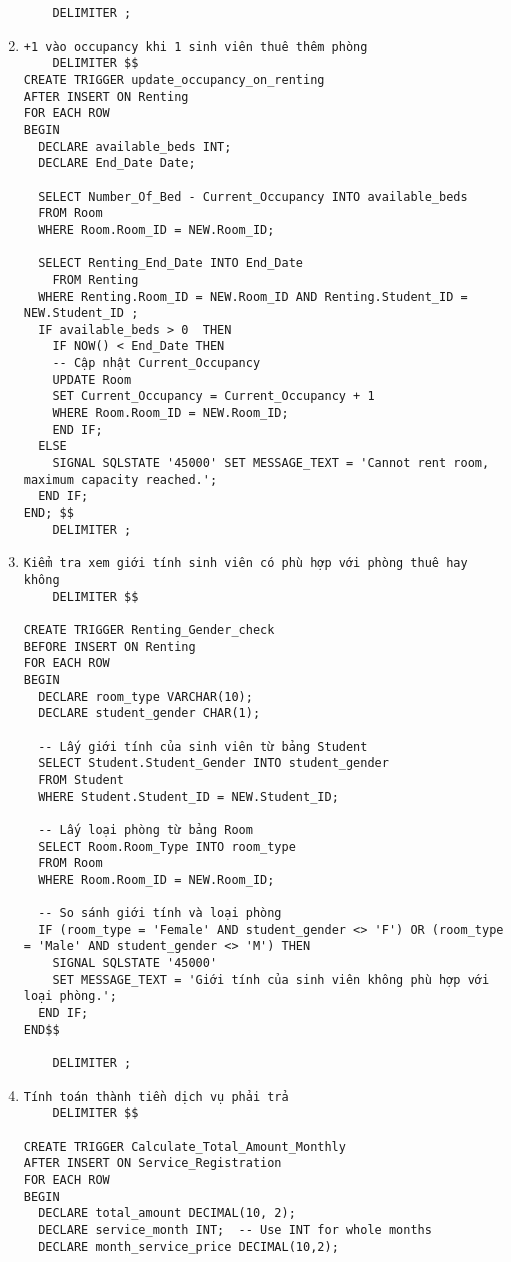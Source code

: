 \documentclass[a4paper,12pt]{article}
\begin{document}
\begin{enumerate}
\begin{verbatim}
    DELIMITER ;
    \end{verbatim}
    \item \begin{verbatim}
+1 vào occupancy khi 1 sinh viên thuê thêm phòng
    DELIMITER $$
CREATE TRIGGER update_occupancy_on_renting
AFTER INSERT ON Renting
FOR EACH ROW
BEGIN
  DECLARE available_beds INT;
  DECLARE End_Date Date;

  SELECT Number_Of_Bed - Current_Occupancy INTO available_beds
  FROM Room
  WHERE Room.Room_ID = NEW.Room_ID;
  
  SELECT Renting_End_Date INTO End_Date
	FROM Renting
  WHERE Renting.Room_ID = NEW.Room_ID AND Renting.Student_ID = NEW.Student_ID ;
  IF available_beds > 0  THEN
	IF NOW() < End_Date THEN
    -- Cập nhật Current_Occupancy
    UPDATE Room
    SET Current_Occupancy = Current_Occupancy + 1
    WHERE Room.Room_ID = NEW.Room_ID;
    END IF;
  ELSE
    SIGNAL SQLSTATE '45000' SET MESSAGE_TEXT = 'Cannot rent room, maximum capacity reached.';
  END IF;
END; $$
    DELIMITER ;
    \end{verbatim}
    \item \begin{verbatim}
Kiểm tra xem giới tính sinh viên có phù hợp với phòng thuê hay không
    DELIMITER $$

CREATE TRIGGER Renting_Gender_check
BEFORE INSERT ON Renting
FOR EACH ROW
BEGIN
  DECLARE room_type VARCHAR(10);
  DECLARE student_gender CHAR(1);

  -- Lấy giới tính của sinh viên từ bảng Student
  SELECT Student.Student_Gender INTO student_gender
  FROM Student
  WHERE Student.Student_ID = NEW.Student_ID;

  -- Lấy loại phòng từ bảng Room
  SELECT Room.Room_Type INTO room_type
  FROM Room
  WHERE Room.Room_ID = NEW.Room_ID;

  -- So sánh giới tính và loại phòng
  IF (room_type = 'Female' AND student_gender <> 'F') OR (room_type = 'Male' AND student_gender <> 'M') THEN
    SIGNAL SQLSTATE '45000'
    SET MESSAGE_TEXT = 'Giới tính của sinh viên không phù hợp với loại phòng.';
  END IF;
END$$

    DELIMITER ;
    \end{verbatim}
    \item \begin{verbatim}
Tính toán thành tiền dịch vụ phải trả
    DELIMITER $$

CREATE TRIGGER Calculate_Total_Amount_Monthly
AFTER INSERT ON Service_Registration
FOR EACH ROW
BEGIN
  DECLARE total_amount DECIMAL(10, 2);
  DECLARE service_month INT;  -- Use INT for whole months
  DECLARE month_service_price DECIMAL(10,2);


\end{verbatim}
\end{enumerate}
\end{document}
